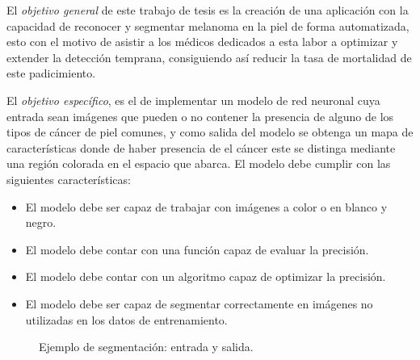 El \emph{objetivo general} de este trabajo de tesis es la creación de una aplicación con la capacidad de reconocer y segmentar melanoma en la piel de forma automatizada, esto con el motivo de asistir a los médicos dedicados a esta labor a optimizar y extender la detección temprana, consiguiendo así reducir la tasa de mortalidad de este padicimiento.

El \emph{objetivo específico}, es el de implementar un modelo de red neuronal cuya entrada sean imágenes que pueden o no contener la presencia de alguno de los tipos de cáncer de piel comunes, y como salida del modelo se obtenga un mapa de características donde de haber presencia de el cáncer este se distinga mediante una región colorada en el espacio que abarca. El modelo debe cumplir con las siguientes características:

\begin{itemize}
    \item El modelo debe ser capaz de trabajar con imágenes a color o en blanco y negro.
    \item El modelo debe contar con una función capaz de evaluar la precisión.
    \item El modelo debe contar con un algoritmo capaz de optimizar la precisión.
    \item El modelo debe ser capaz de segmentar correctamente en imágenes no utilizadas en los datos de entrenamiento.
\end{itemize}

\begin{figure}[!htp]
    \centering
    \qquad
    \caption{Ejemplo de segmentación: entrada y salida.}
    \label{data_1}
\end{figure}

